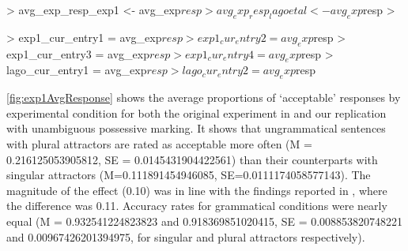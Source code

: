 \documentclass[doc,a4paper,man,natbib,floatsintext,noextraspace]{apa6}
\begin{document}
\begin{Schunk}
\begin{Sinput}
> avg_exp_resp_exp1 <- avg_exp$resp %>% subset(experiment == "Experiment 1")
> avg_exp_resp_lagoetal <- avg_exp$resp %>% subset(experiment == "Lago et al. (2018)")
> 
\end{Sinput}
\end{Schunk}

\begin{Schunk}
\begin{Sinput}
> exp1_cur_entry1 = avg_exp$resp %>% filter(experiment == "Experiment 1", grammatical == "ungrammatical", attractor_num == "plural")
> exp1_cur_entry2 = avg_exp$resp %>% filter(experiment == "Experiment 1", grammatical == "ungrammatical", attractor_num == "singular")
> exp1_cur_entry3 = avg_exp$resp %>% filter(experiment == "Experiment 1", grammatical == "grammatical", attractor_num == "singular")
> exp1_cur_entry4 = avg_exp$resp %>% filter(experiment == "Experiment 1", grammatical == "grammatical", attractor_num == "plural")
> lago_cur_entry1 = avg_exp$resp %>% filter(experiment == "Lago et al. (2018)", grammatical == "ungrammatical", attractor_num == "plural")
> lago_cur_entry2 = avg_exp$resp %>% filter(experiment == "Lago et al. (2018)", grammatical == "ungrammatical", attractor_num == "singular")
\end{Sinput}
\end{Schunk}
\autoref{fig:exp1AvgResponse} shows the average proportions of ‘acceptable’ responses by experimental condition for both the original experiment in \citet{LagoEtAl:2018} and our replication with unambiguous possessive marking. 
It shows that ungrammatical sentences with plural attractors are rated as acceptable more often
(M = 0.216125053905812, 
SE = 0.0145431904422561) 
than their counterparts with singular attractors 
(M=0.111891454946085, 
SE=0.0111174058577143).
%
The magnitude of the effect (0.10) was in line with the findings reported in \citet{LagoEtAl:2018}, where the difference was 0.11.
% 
Accuracy rates for grammatical conditions were nearly equal
(M = 0.932541224823823 and 0.918369851020415, SE = 0.008853820748221 and 0.00967426201394975, for singular and plural attractors respectively). 
\end{document}
